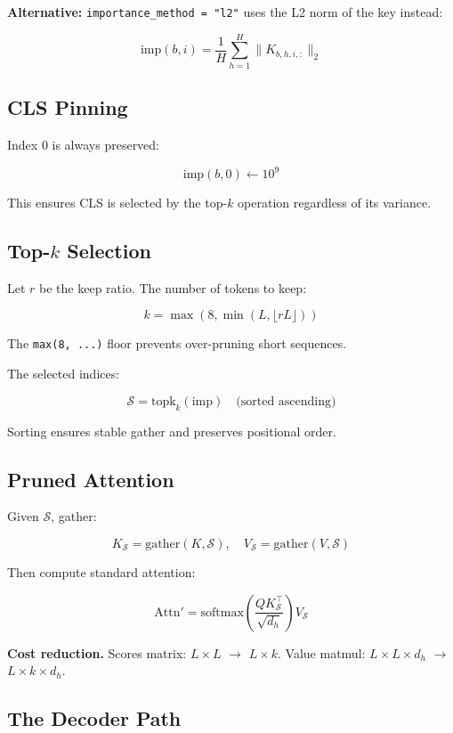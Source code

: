 \textbf{Alternative:} \texttt{importance\_method = "l2"} uses the L2 norm of the key 
instead:

\[
\text{imp}(b, i) = \frac{1}{H} \sum_{h=1}^{H} \|K_{b,h,i,:}\|_2
\tag{4.2}
\]

\subsection{CLS Pinning}

Index 0 is always preserved:

\[
\text{imp}(b, 0) \leftarrow 10^9
\tag{4.3}
\]

This ensures CLS is selected by the top-$k$ operation regardless of its 
variance.

\subsection{Top-$k$ Selection}

Let $r$ be the keep ratio. The number of tokens to keep:

\[
k = \max\!\left(8, \min\!\left(L, \lfloor r L \rfloor\right)\right)
\tag{4.4}
\]

The \texttt{max(8, ...)} floor prevents over-pruning short sequences.

The selected indices:

\[
\mathcal{S} = \text{topk}_k(\text{imp}) \quad \text{(sorted ascending)}
\tag{4.5}
\]

Sorting ensures stable gather and preserves positional order.

\subsection{Pruned Attention}

Given $\mathcal{S}$, gather:

\[
K_{\mathcal{S}} = \text{gather}(K, \mathcal{S}), \quad
V_{\mathcal{S}} = \text{gather}(V, \mathcal{S})
\tag{4.6}
\]

Then compute standard attention:

\[
\text{Attn}' = \text{softmax}\!\left(\frac{Q K_{\mathcal{S}}^\top}{\sqrt{d_h}}\right)V_{\mathcal{S}}
\tag{4.7}
\]

\textbf{Cost reduction.} Scores matrix: $L \times L$ $\to$ $L \times k$. Value matmul: 
$L \times L \times d_h$ $\to$ $L \times k \times d_h$.

\subsection{The Decoder Path}

